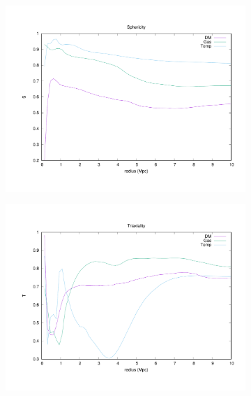 \documentclass[journal]{IEEEtran}
\begin{document}
\begin{figure}[!t]
\centering
	\begin{subfigure}[t]{0.3\textwidth}
		\centering
		\includegraphics[width=\linewidth]{Sphericity.pdf}
	\end{subfigure}
	\quad
	\begin{subfigure}[t]{0.3\textwidth}
		\centering
		\includegraphics[width=\linewidth]{Triaxiality.pdf}
	\end{subfigure}
	\quad
	\begin{subfigure}[t]{0.3\textwidth}
		\centering

\end{subfigure}
\end{figure}
\end{document}
